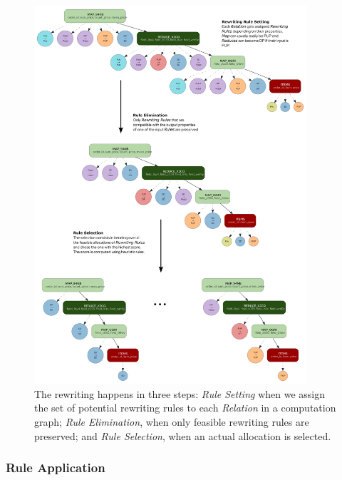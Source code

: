 \documentclass{article}
\begin{document}
    \begin{figure}[t]
        \centering
        \includegraphics[width=0.9\textwidth]{figures/set_eliminate_select} %
        \caption{The rewriting happens in three steps: \emph{Rule Setting} when we assign the set of potential rewriting rules to each \emph{Relation} in a computation graph; \emph{Rule Elimination}, when only feasible rewriting rules are preserved; and \emph{Rule Selection}, when an actual allocation is selected.}
        \label{fig:set_eliminate_select}
    \end{figure}
    
    \subsubsection{Rule Application}
    
\end{document}
